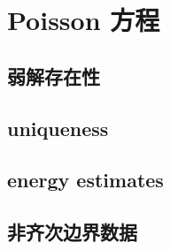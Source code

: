 \section{Poisson 方程}
\label{b2:sec:1503}


\subsection{弱解存在性}
\label{b2:subsec:150301}

\subsection{uniqueness}
\label{b2:subsec:150302}

\subsection{energy estimates}
\label{b2:subsec:150303}

\subsection{非齐次边界数据}
\label{b2:subsec:150304}


